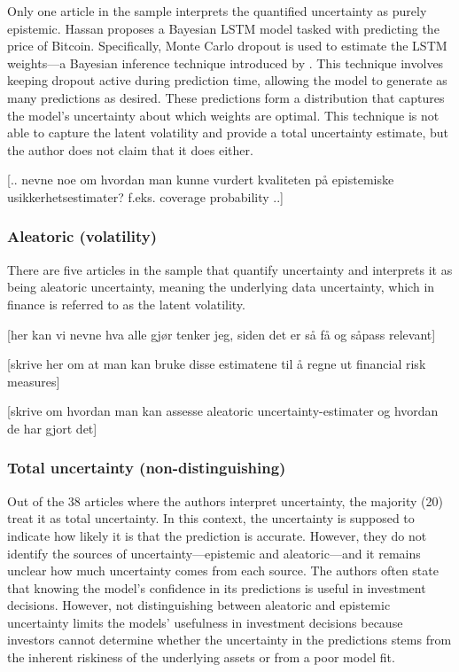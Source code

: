 Only one article in the sample \parencite{hassan2023} interprets the quantified uncertainty as purely epistemic. Hassan proposes a Bayesian LSTM model tasked with predicting the price of Bitcoin. Specifically, Monte Carlo dropout is used to estimate the LSTM weights—a Bayesian inference technique introduced by \textcite{gal_ghahramani_2015}. This technique involves keeping dropout active during prediction time, allowing the model to generate as many predictions as desired. These predictions form a distribution that captures the model's uncertainty about which weights are optimal. This technique is not able to capture the latent volatility and provide a total uncertainty estimate, but the author does not claim that it does either.

[.. nevne noe om hvordan man kunne vurdert kvaliteten på epistemiske usikkerhetsestimater? f.eks. coverage probability ..]


\subsubsection{Aleatoric (volatility)}
There are five articles in the sample that quantify uncertainty and interprets it as being aleatoric uncertainty, meaning the underlying data uncertainty, which in finance is referred to as the latent volatility.

[her kan vi nevne hva alle gjør tenker jeg, siden det er så få og såpass relevant]

[skrive her om at man kan bruke disse estimatene til å regne ut financial risk measures]

[skrive om hvordan man kan assesse aleatoric uncertainty-estimater og hvordan de har gjort det]


\subsubsection{Total uncertainty (non-distinguishing)}
Out of the 38 articles where the authors interpret uncertainty, the majority (20) treat it as total uncertainty. In this context, the uncertainty is supposed to indicate how likely it is that the prediction is accurate. However, they do not identify the sources of uncertainty—epistemic and aleatoric—and it remains unclear how much uncertainty comes from each source. The authors often state that knowing the model's confidence in its predictions is useful in investment decisions. However, not distinguishing between aleatoric and epistemic uncertainty limits the models' usefulness in investment decisions because investors cannot determine whether the uncertainty in the predictions stems from the inherent riskiness of the underlying assets or from a poor model fit.

